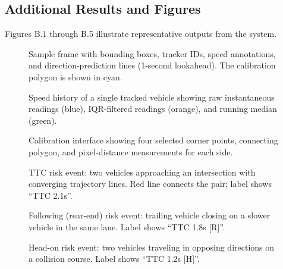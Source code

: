\documentclass[12pt]{report}
\begin{document}
\begin{appendices}
\chapter{Additional Results and Figures}

Figures B.1 through B.5 illustrate representative outputs from the system.

\begin{figure}[H]
    \centering
    \fbox{\rule{0pt}{4cm}\rule{10cm}{0pt}}
    \caption{Sample frame with bounding boxes, tracker IDs, speed annotations, and direction-prediction lines (1-second lookahead). The calibration polygon is shown in cyan.}
    \label{fig:sample_frame}
\end{figure}

\begin{figure}[H]
    \centering
    \fbox{\rule{0pt}{4cm}\rule{10cm}{0pt}}
    \caption{Speed history of a single tracked vehicle showing raw instantaneous readings (blue), IQR-filtered readings (orange), and running median (green).}
    \label{fig:speed_history}
\end{figure}

\begin{figure}[H]
    \centering
    \fbox{\rule{0pt}{4cm}\rule{10cm}{0pt}}
    \caption{Calibration interface showing four selected corner points, connecting polygon, and pixel-distance measurements for each side.}
    \label{fig:calibration}
\end{figure}

\begin{figure}[H]
    \centering
    \fbox{\rule{0pt}{4cm}\rule{10cm}{0pt}}
    \caption{TTC risk event: two vehicles approaching an intersection with converging trajectory lines. Red line connects the pair; label shows ``TTC 2.1s''.}
    \label{fig:conflict_intersection}
\end{figure}

\begin{figure}[H]
    \centering
    \fbox{\rule{0pt}{4cm}\rule{10cm}{0pt}}
    \caption{Following (rear-end) risk event: trailing vehicle closing on a slower vehicle in the same lane. Label shows ``TTC 1.8s [R]''.}
    \label{fig:conflict_following}
\end{figure}

\begin{figure}[H]
    \centering
    \fbox{\rule{0pt}{4cm}\rule{10cm}{0pt}}
    \caption{Head-on risk event: two vehicles traveling in opposing directions on a collision course. Label shows ``TTC 1.2s [H]''.}
    \label{fig:conflict_headon}
\end{figure}


\end{appendices}
\end{document}
